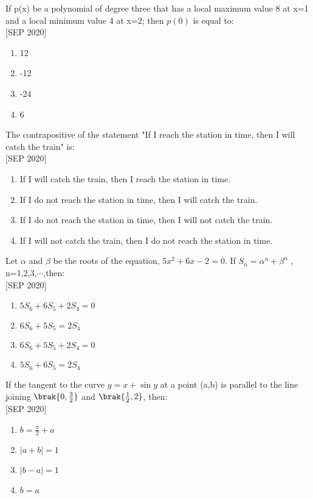     \item If p(x) be a polynomial of degree three that has a local maximum value 8 at x=1 and a local minimum value 4 at x=2; then $p(0)$ is equal to: \\\hfill{[SEP 2020]}
    \begin{multicols}{4}
    \begin{enumerate}
        \item 12
        \item -12
        \item -24
        \item 6
    \end{enumerate} 
    \end{multicols}
    \item The contrapositive of the statement "If I reach the station in time, then I will catch the train" is: \\\hfill{[SEP 2020]}
    \begin{enumerate}
        \item If I will catch the train, then I reach the station in time.
        \item If I do not reach the station in time, then I will catch the train.
        \item If I do not reach the station in time, then I will not catch the train.
        \item If I will not catch the train, then I do not reach the station in time.
    \end{enumerate} 
    \item Let $\alpha$ and $\beta$ be the roots of the equation, $5x^2+6x-2=0$. If $S_n = \alpha^n + \beta^n$ , n=1,2,3,$\cdots$,then: \\\hfill{[SEP 2020]}
    \begin{multicols}{2}
    \begin{enumerate}
        \item $5S_6+6S_5+2S_4=0$
        \item $6S_6+5S_5=2S_4$
        \item $6S_6+5S_5+2S_4=0$
        \item $5S_6+6S_5=2S_4$
    \end{enumerate} 
    \end{multicols}
    \item If the tangent to the curve $y=x+\sin{y}$ at a point (a,b) is parallel to the line joining $\brak{0,\frac{3}{2}}$ and $\brak{\frac{1}{2},{2}}$, then: \\\hfill{[SEP 2020]}
    \begin{multicols}{4}
    \begin{enumerate}
        \item $b = \frac{\pi}{2} + a$
        \item $|a + b| = 1$
        \item $|b - a| = 1$
        \item $b = a$
    \end{enumerate} 
    \end{multicols}
